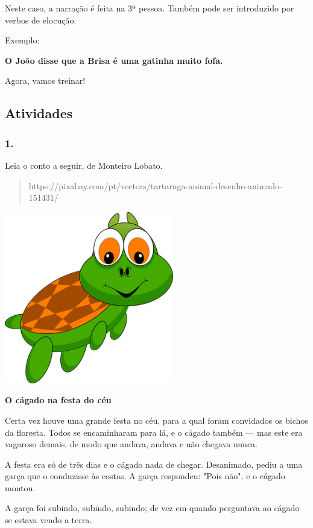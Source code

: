 Neste caso, a narração é feita na 3ª pessoa. Também pode ser introduzido
por verbos de elocução.

Exemplo:

\textbf{O João disse que a Brisa é uma gatinha muito fofa.}

Agora, vamos treinar!

\subsection{Atividades}\label{atividades-5}

\subsubsection{1. }\label{section-55}

Leia o conto a seguir, de Monteiro Lobato.

\begin{quote}
https://pixabay.com/pt/vectors/tartaruga-animal-desenho-animado-151431/
\end{quote}

\includegraphics[width=2.90902in,height=2.95828in]{media/image19.png}

\textbf{O cágado na festa do céu}

Certa vez houve uma grande festa no céu, para a qual foram convidados os
bichos da floresta. Todos se encaminharam para lá, e o cágado também ---
mas este era vagaroso demais, de modo que andava, andava e não chegava
nunca.

A festa era só de três dias e o cágado nada de chegar. Desanimado, pediu
a uma garça que o conduzisse às costas. A garça respondeu: "Pois não", e
o cágado montou.

A garça foi subindo, subindo, subindo; de vez em quando perguntava ao
cágado se estava vendo a terra.

